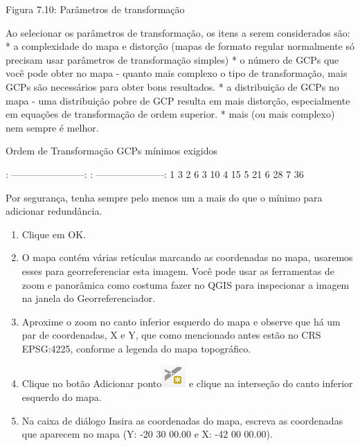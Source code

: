 \documentclass[
  portuguese,
]{krantz}
\providecommand{\tightlist}{%
  \setlength{\itemsep}{0pt}\setlength{\parskip}{0pt}}
\begin{document}
Figura 7.10: Parâmetros de transformação

Ao selecionar os parâmetros de transformação, os itens a serem considerados são:
* a complexidade do mapa e distorção (mapas de formato regular normalmente só precisam usar parâmetros de transformação simples)
* o número de GCPs que você pode obter no mapa - quanto mais complexo o tipo de transformação, mais GCPs são necessários para obter bons resultados.
* a distribuição de GCPs no mapa - uma distribuição pobre de GCP resulta em mais distorção, especialmente em equações de transformação de ordem superior.
* mais (ou mais complexo) nem sempre é melhor.

Ordem de Transformação \textbar{} GCPs mínimos exigidos \textbar{}

\textbar: -----------------------: \textbar: ---------------------: \textbar{}
\textbar{} 1 \textbar{} 3 \textbar{}
\textbar{} 2 \textbar{} 6 \textbar{}
\textbar{} 3 \textbar{} 10 \textbar{}
\textbar{} 4 \textbar{} 15 \textbar{}
\textbar{} 5 \textbar{} 21 \textbar{}
\textbar{} 6 \textbar{} 28 \textbar{}
\textbar{} 7 \textbar{} 36 \textbar{}

Por segurança, tenha sempre pelo menos um a mais do que o mínimo para adicionar redundância.

\begin{enumerate}
\def\labelenumi{\arabic{enumi}.}
\setcounter{enumi}{5}
\tightlist
\item
  Clique em OK.
\item
  O mapa contém várias retículas marcando as coordenadas no mapa, usaremos esses para georreferenciar esta imagem. Você pode usar as ferramentas de zoom e panorâmica como costuma fazer no QGIS para inspecionar a imagem na janela do Georreferenciador.
\item
  Aproxime o zoom no canto inferior esquerdo do mapa e observe que há um par de coordenadas, X e Y, que como mencionado antes estão no CRS EPSG:4225, conforme a legenda do mapa topográfico.
\item
  Clique no botão Adicionar ponto\includegraphics{media/modulo7/add-point.png} e clique na interseção do canto inferior esquerdo do mapa.
\item
  Na caixa de diálogo Insira as coordenadas do mapa, escreva as coordenadas que aparecem no mapa (Y: -20 30 00.00 e X: -42 00 00.00).
\end{enumerate}
\end{document}
